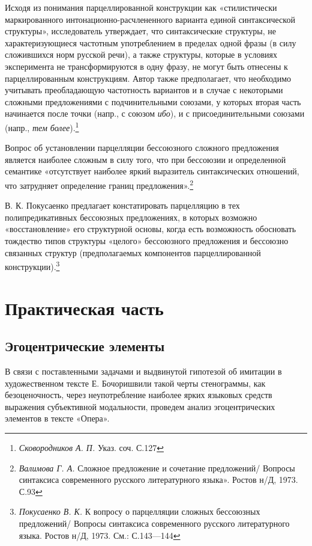 \documentclass{kursa4}
\begin{document}
{      {Исходя из понимания парцеллированной конструкции
      как «стилистически маркированного интонационно-расчлененного варианта
      единой синтаксической структуры», исследователь утверждает, что
      синтаксические структуры, не характеризующиеся частотным употреблением
      в пределах одной фразы (в силу сложившихся норм русской речи), а также
      структуры, которые в условиях эксперимента не трансформируются в одну
      фразу, не могут быть отнесены к парцеллированным конструкциям. Автор
      также предполагает, что необходимо учитывать преобладающую частотность
      вариантов и в случае с некоторыми сложными предложениями с
      подчинительными союзами, у которых вторая часть начинается после точки
      (напр., с союзом }\textit{{ибо}}{), и
      с присоединительными союзами (напр., }\textit{{тем
      более}}{).}\footnote{\textit{{
      Сковородников А. П. }}{Указ. соч. С.127}}

      {Вопрос об установлении парцелляции бессоюзного
      сложного предложения является наиболее сложным в силу того, что при
      бессоюзии и определенной семантике «отсутствует наиболее яркий
      выразитель синтаксических отношений, что затрудняет определение границ
      предложения».}\footnote{{
      }\textit{{Валимова Г. А. }}{Сложное
      предложение и сочетание предложений/ Вопросы синтаксиса современного
      русского литературного языка». Ростов н/Д, 1973. С.93}}

      {В. К. Покусаенко предлагает констатировать
      парцелляцию в тех полипредикативных бессоюзных предложениях, в которых
      возможно «восстановление» его структурной основы, когда есть
      возможность обосновать тождество типов структуры «целого» бессоюзного
      предложения и бессоюзно связанных структур (предполагаемых компонентов
      парцеллированной конструкции).}\footnote{{
      }\textit{{Покусаенко В. К. }}{К
      вопросу о парцелляции сложных бессоюзных предложений/ Вопросы
      синтаксиса современного русского литературного языка. Ростов н/Д,
      1973. См.: С.143—144}}

  \chapter{Практическая часть}

    \section{Эгоцентрические элементы}

      В связи с поставленными задачами и выдвинутой
      гипотезой об имитации в художественном тексте Е. Бочоришвили такой
      черты стенограммы, как безоценочность, через неупотребление наиболее
      ярких языковых средств выражения субъективной модальности, проведем
      анализ эгоцентрических элементов в тексте «Опера».

}
\end{document}
